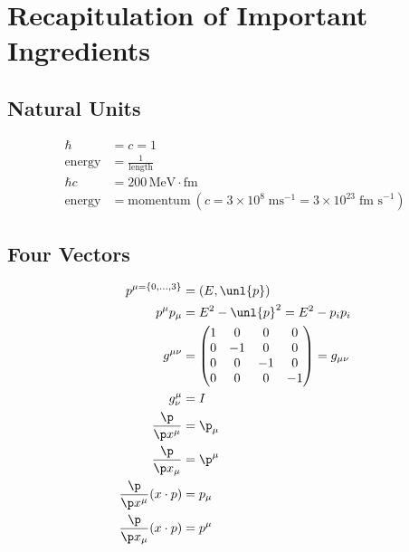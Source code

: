 \documentclass[a4paper, 11pt, normalem]{report}
\begin{document}
\chapter{Recapitulation of Important Ingredients}

\section{Natural Units}
\begin{align}
    \hbar &= c = 1 \\
    \text{energy} &= \frac{1}{\text{length}} \\
    \hbar c &= 200\,\text{MeV}\cdot\text{fm} \\
    \text{energy} &= \text{momentum}~ (c = 3\times10^8\;\text{ms}^{-1} = 3\times10^{23}\;\text{fm s}^{-1})
\end{align}

\section{Four Vectors}
\begin{align}
    p^{\mu=\{0,\dots,3\}} &= (E,\unl{p}) \\
    p^\mu p_\mu &= E^2 - \unl{p}^2 = E^2 - p_ip_i \\
    g^{\mu\nu} &= \begin{pmatrix} 1 & 0 & 0 & 0 \\ 0 & -1 & 0 & 0 \\ 0 & 0 & -1 & 0 \\ 0 & 0 & 0 & -1 \end{pmatrix} = g_{\mu\nu} \\
    g^\mu_\nu &= I \\
    \frac{\p}{\p x^\mu} &= \p_\mu \\
    \frac{\p}{\p x_\mu} &= \p^\mu \\
    \frac{\p}{\p x^\mu} (x\cdot p) &= p_\mu \\
    \frac{\p}{\p x_\mu} (x\cdot p) &= p^\mu
\end{align}
\end{document}
